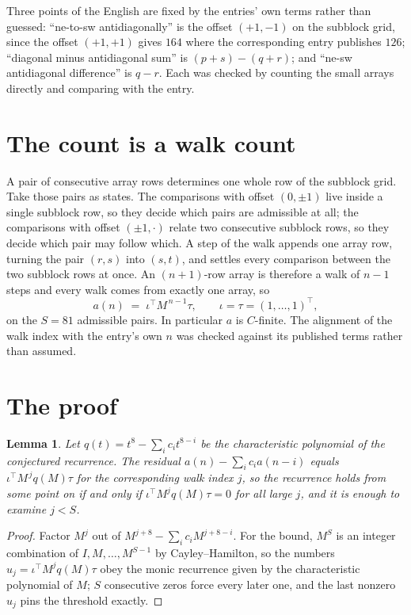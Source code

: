 \documentclass[11pt,a4paper]{article}
\theoremstyle{plain}
\newtheorem{lemma}[theorem]{Lemma}
\theoremstyle{definition}
\begin{document}
Three points of the English are fixed by the entries' own terms rather than guessed:
``ne-to-sw antidiagonally'' is the offset $(+1,-1)$ on the subblock grid, since the offset
$(+1,+1)$ gives $164$ where the corresponding entry publishes $126$; ``diagonal minus
antidiagonal sum'' is $(p+s)-(q+r)$; and ``ne-sw antidiagonal difference'' is $q-r$. Each was
checked by counting the small arrays directly and comparing with the entry.

\section{The count is a walk count}

A pair of consecutive array rows determines one whole row of the subblock grid. Take those
pairs as states. The comparisons with offset $(0,\pm1)$ live inside a single subblock row, so
they decide which pairs are admissible at all; the comparisons with offset $(\pm1,\cdot)$
relate two consecutive subblock rows, so they decide which pair may follow which. A step of the
walk appends one array row, turning the pair $(r,s)$ into $(s,t)$, and settles every comparison
between the two subblock rows at once. An $(n+1)$-row array is therefore a walk of $n-1$ steps
and every walk comes from exactly one array, so
\[
a(n)\;=\;\iota^{\!\top}M^{\,n-1}\tau,\qquad \iota=\tau=(1,\dots,1)^{\!\top},
\]
on the $S=81$ admissible pairs. In particular $a$ is $C$-finite. The alignment of the walk
index with the entry's own $n$ was checked against its published terms rather than assumed.

\section{The proof}

\begin{lemma}\label{lem:crit}
Let $q(t)=t^{8}-\sum_i c_it^{8-i}$ be the characteristic polynomial of the
conjectured recurrence. The residual $a(n)-\sum_ic_ia(n-i)$ equals
$\iota^{\!\top}M^{\,j}q(M)\tau$ for the corresponding walk index $j$, so the recurrence
holds from some point on if and only if $\iota^{\!\top}M^{j}q(M)\tau=0$ for all large $j$,
and it is enough to examine $j<S$.
\end{lemma}

\begin{proof}
Factor $M^{j}$ out of $M^{j+8}-\sum_ic_iM^{j+8-i}$. For the bound, $M^{S}$
is an integer combination of $I,M,\dots,M^{S-1}$ by Cayley--Hamilton, so the numbers
$u_j=\iota^{\!\top}M^{j}q(M)\tau$ obey the monic recurrence given by the characteristic
polynomial of $M$; $S$ consecutive zeros force every later one, and the last nonzero $u_j$
pins the threshold exactly.
\end{proof}
\end{document}
